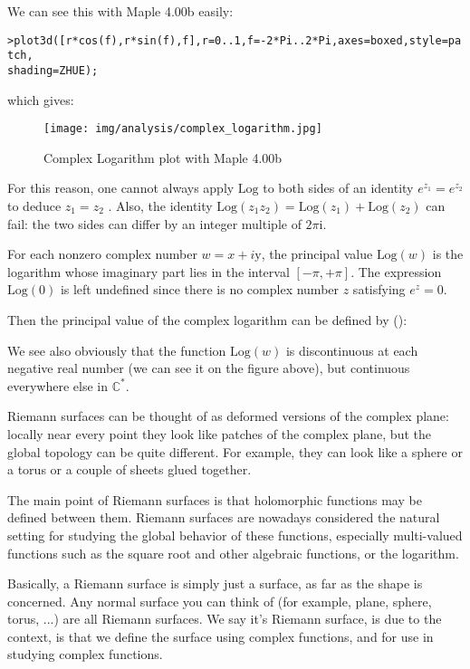 	We can see this with Maple 4.00b easily:
	
	\texttt{>plot3d([r*cos(f),r*sin(f),f],r=0..1,f=-2*Pi..2*Pi,axes=boxed,style=patch,\\
	shading=ZHUE);}
	
	which gives:
	\begin{figure}[H]
		\begin{center}
			\texttt{[image: img/analysis/complex\_logarithm.jpg]}
		\end{center}	
		\caption{Complex Logarithm plot with Maple 4.00b}
	\end{figure}
	
	For this reason, one cannot always apply $\text{Log}$ to both sides of an identity $e^{z_1}=e^{z_2}$ to deduce $z_1=z_2$ . Also, the identity $\text{Log} (z_1z_2)= \text{Log}(z_1) + \text{Log}(z_2)$ can fail: the two sides can differ by an integer multiple of $2\pi \mathrm{i}$.
	
	For each nonzero complex number $w = x + i\mathrm{y}$, the principal value $\text{Log}(w)$ is the logarithm whose imaginary part lies in the interval $[-\pi,+\pi]$. The expression $\text{Log}(0)$ is left undefined since there is no complex number $z$ satisfying $e^z = 0$.
	
	Then the principal value of the complex logarithm can be defined by ():
	
	We see also obviously that the function $\text{Log}(w)$ is discontinuous at each negative real number (we can see it on the figure above), but continuous everywhere else in $\mathbb{C}^*$.
	
	Riemann surfaces can be thought of as deformed versions of the complex plane: locally near every point they look like patches of the complex plane, but the global topology can be quite different. For example, they can look like a sphere or a torus or a couple of sheets glued together.
	
	The main point of Riemann surfaces is that holomorphic functions may be defined between them. Riemann surfaces are nowadays considered the natural setting for studying the global behavior of these functions, especially multi-valued functions such as the square root and other algebraic functions, or the logarithm.
	
	Basically, a Riemann surface is simply just a surface, as far as the shape is concerned. Any normal surface you can think of (for example, plane, sphere, torus, ...) are all Riemann surfaces. We say it's Riemann surface, is due to the context, is that we define the surface using complex functions, and for use in studying complex functions.
	

